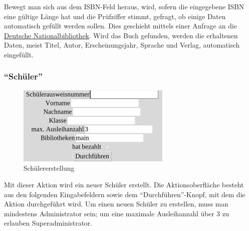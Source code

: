 Bewegt man sich aus dem ISBN-Feld heraus, wird, sofern die eingegebene ISBN eine gültige Länge hat und die Prüfziffer stimmt, gefragt, ob einige Daten automatisch gefüllt werden sollen.
Dies geschieht mittels einer Anfrage an die \href{https://portal.dnb.de}{Deutsche Nationalbibliothek}.
Wird das Buch gefunden, werden die erhaltenen Daten, meist Titel, Autor, Erscheinungsjahr, Sprache und Verlag, automatisch eingefüllt.



\subsubsection{``Schüler''}
\label{subsubsec:detail:new:person}
\begin{figure}\includegraphics{images/gui2/new_person.jpg}\caption{Schülererstellung}\label{fig:new_person}\end{figure}

Mit dieser Aktion wird ein neuer Schüler erstellt. Die Aktionsoberfläche besteht aus den folgenden Eingabefeldern sowie dem ``Durchführen''-Knopf, mit dem die Aktion durchgeführt wird.
Um einen neuen Schüler zu erstellen, muss man mindestens Administrator sein; um eine maximale Ausleihanzahl über 3 zu erlauben Superadministrator.

